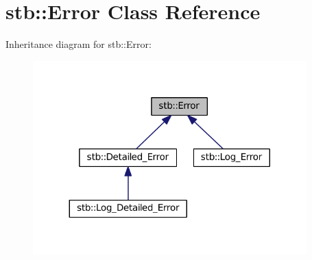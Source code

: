 \hypertarget{classstb_1_1Error}{\section{stb\+:\+:Error Class Reference}
\label{classstb_1_1Error}
}


Inheritance diagram for stb\+:\+:Error\+:
\nopagebreak
\begin{figure}[H]
\begin{center}
\leavevmode
\includegraphics[width=299pt]{classstb_1_1Error__inherit__graph}
\end{center}
\end{figure}
